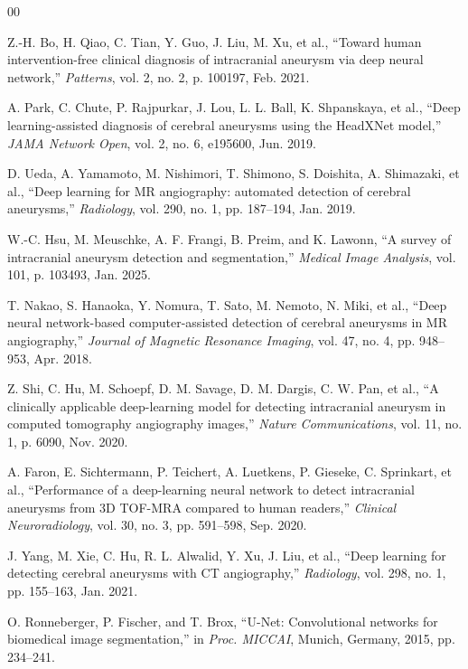 \documentclass[conference]{IEEEtran}
\begin{document}

\begin{thebibliography}{00}

Z.-H. Bo, H. Qiao, C. Tian, Y. Guo, J. Liu, M. Xu, et al., ``Toward human intervention-free clinical diagnosis of intracranial aneurysm via deep neural network,'' \textit{Patterns}, vol. 2, no. 2, p. 100197, Feb. 2021.

A. Park, C. Chute, P. Rajpurkar, J. Lou, L. L. Ball, K. Shpanskaya, et al., ``Deep learning-assisted diagnosis of cerebral aneurysms using the HeadXNet model,'' \textit{JAMA Network Open}, vol. 2, no. 6, e195600, Jun. 2019.

D. Ueda, A. Yamamoto, M. Nishimori, T. Shimono, S. Doishita, A. Shimazaki, et al., ``Deep learning for MR angiography: automated detection of cerebral aneurysms,'' \textit{Radiology}, vol. 290, no. 1, pp. 187--194, Jan. 2019.

W.-C. Hsu, M. Meuschke, A. F. Frangi, B. Preim, and K. Lawonn, ``A survey of intracranial aneurysm detection and segmentation,'' \textit{Medical Image Analysis}, vol. 101, p. 103493, Jan. 2025.

T. Nakao, S. Hanaoka, Y. Nomura, T. Sato, M. Nemoto, N. Miki, et al., ``Deep neural network-based computer-assisted detection of cerebral aneurysms in MR angiography,'' \textit{Journal of Magnetic Resonance Imaging}, vol. 47, no. 4, pp. 948--953, Apr. 2018.

Z. Shi, C. Hu, M. Schoepf, D. M. Savage, D. M. Dargis, C. W. Pan, et al., ``A clinically applicable deep-learning model for detecting intracranial aneurysm in computed tomography angiography images,'' \textit{Nature Communications}, vol. 11, no. 1, p. 6090, Nov. 2020.

A. Faron, E. Sichtermann, P. Teichert, A. Luetkens, P. Gieseke, C. Sprinkart, et al., ``Performance of a deep-learning neural network to detect intracranial aneurysms from 3D TOF-MRA compared to human readers,'' \textit{Clinical Neuroradiology}, vol. 30, no. 3, pp. 591--598, Sep. 2020.

J. Yang, M. Xie, C. Hu, R. L. Alwalid, Y. Xu, J. Liu, et al., ``Deep learning for detecting cerebral aneurysms with CT angiography,'' \textit{Radiology}, vol. 298, no. 1, pp. 155--163, Jan. 2021.

O. Ronneberger, P. Fischer, and T. Brox, ``U-Net: Convolutional networks for biomedical image segmentation,'' in \textit{Proc. MICCAI}, Munich, Germany, 2015, pp. 234--241.


\end{thebibliography}
\end{document}
